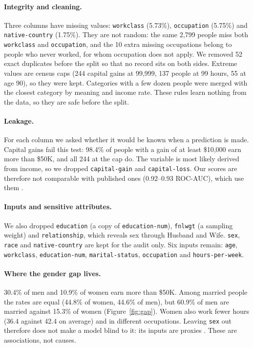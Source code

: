 \documentclass[11pt,a4paper]{article}
\newcommand{\code}[1]{\texttt{#1}}
\begin{document}
\paragraph{Integrity and cleaning.} Three columns have missing values: \code{workclass} (5.73\%), \code{occupation} (5.75\%) and \code{native-country} (1.75\%). They are not random: the same 2{,}799 people miss both \code{workclass} and \code{occupation}, and the 10 extra missing occupations belong to people who never worked, for whom occupation does not apply. We removed 52 exact duplicates before the split so that no record sits on both sides. Extreme values are census caps (244 capital gains at 99{,}999, 137 people at 99 hours, 55 at age 90), so they were kept. Categories with a few dozen people were merged with the closest category by meaning and income rate. These rules learn nothing from the data, so they are safe before the split.

\paragraph{Leakage.} For each column we asked whether it would be known when a prediction is made. Capital gains fail this test: 98.4\% of people with a gain of at least \$10{,}000 earn more than \$50K, and all 244 at the cap do. The variable is most likely derived from income, so we dropped \code{capital-gain} and \code{capital-loss}. Our scores are therefore not comparable with published ones (0.92--0.93 ROC-AUC), which use them \cite{chakrabarty2018}.

\paragraph{Inputs and sensitive attributes.} We also dropped \code{education} (a copy of \code{education-num}), \code{fnlwgt} (a sampling weight) and \code{relationship}, which reveals sex through Husband and Wife. \code{sex}, \code{race} and \code{native-country} are kept for the audit only. Six inputs remain: \code{age}, \code{workclass}, \code{education-num}, \code{marital-status}, \code{occupation} and \code{hours-per-week}.

\paragraph{Where the gender gap lives.} 30.4\% of men and 10.9\% of women earn more than \$50K. Among married people the rates are equal (44.8\% of women, 44.6\% of men), but 60.9\% of men are married against 15.3\% of women (Figure~\ref{fig:gap}). Women also work fewer hours (36.4 against 42.4 on average) and in different occupations. Leaving \code{sex} out therefore does not make a model blind to it: its inputs are proxies \cite{besse2022}. These are associations, not causes.
\end{document}
